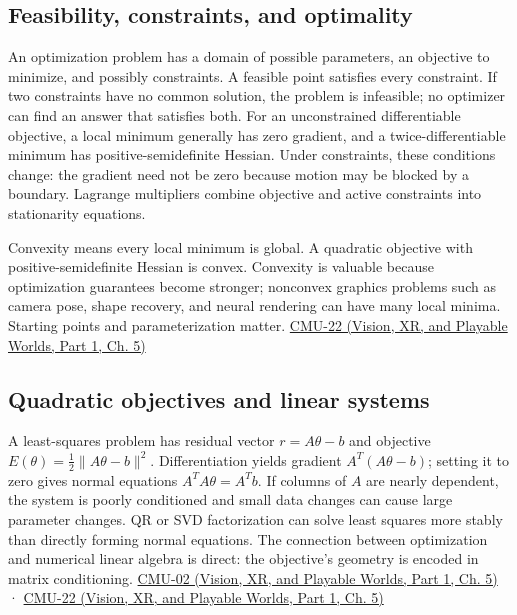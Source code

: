 \subsection{Feasibility, constraints, and optimality}\label{04-visual-computing-ii-ch029-feasibility-constraints-and-optimality}

\hypertarget{04-visual-computing-ii-ch029-feasibility-constraints-and-optimality}{}

An optimization problem has a domain of possible parameters, an objective to minimize, and possibly constraints. A feasible point satisfies every constraint. If two constraints have no common solution, the problem is infeasible; no optimizer can find an answer that satisfies both. For an unconstrained differentiable objective, a local minimum generally has zero gradient, and a twice-differentiable minimum has positive-semidefinite Hessian. Under constraints, these conditions change: the gradient need not be zero because motion may be blocked by a boundary. Lagrange multipliers combine objective and active constraints into stationarity equations.

Convexity means every local minimum is global. A quadratic objective with positive-semidefinite Hessian is convex. Convexity is valuable because optimization guarantees become stronger; nonconvex graphics problems such as camera pose, shape recovery, and neural rendering can have many local minima. Starting points and parameterization matter. \href{../07-Vision-XR-and-Playable-Worlds-P01/main.pdf\#nameddest=04-visual-computing-ii-ch036-cmu-22---optimization}{CMU-22 (Vision, XR, and Playable Worlds, Part 1, Ch. 5)}

\subsection{Quadratic objectives and linear systems}\label{04-visual-computing-ii-ch029-quadratic-objectives-and-linear-systems}

\hypertarget{04-visual-computing-ii-ch029-quadratic-objectives-and-linear-systems}{}

A least-squares problem has residual vector \(r=A\theta-b\) and objective \(E(\theta)=\tfrac12\|A\theta-b\|^2\). Differentiation yields gradient \(A^T(A\theta-b)\); setting it to zero gives normal equations \(A^TA\theta=A^Tb\). If columns of \(A\) are nearly dependent, the system is poorly conditioned and small data changes can cause large parameter changes. QR or SVD factorization can solve least squares more stably than directly forming normal equations. The connection between optimization and numerical linear algebra is direct: the objective's geometry is encoded in matrix conditioning. \href{../07-Vision-XR-and-Playable-Worlds-P01/main.pdf\#nameddest=04-visual-computing-ii-ch036-cmu-02---linear-algebra-preview}{CMU-02 (Vision, XR, and Playable Worlds, Part 1, Ch. 5)} · \href{../07-Vision-XR-and-Playable-Worlds-P01/main.pdf\#nameddest=04-visual-computing-ii-ch036-cmu-22---optimization}{CMU-22 (Vision, XR, and Playable Worlds, Part 1, Ch. 5)}

